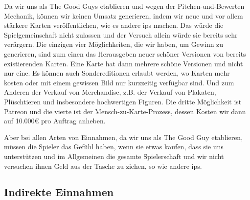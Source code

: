 \documentclass[fontsize=11, a4aper]{scrartcl}
\begin{document}
\noindent Da wir uns als \glqq The Good Guys\grqq{} etablieren und wegen der Pitchen-und-Bewerten Mechanik, können wir keinen Umsatz generieren, indem wir neue und vor allem stärkere Karten veröffentlichen, wie es andere \acp{ip} machen. Das würde die Spielgemeinschaft nicht zulassen und der Versuch allein würde sie bereits sehr verärgern. Die einzigen vier Möglichkeiten, die wir haben, um Gewinn zu generieren, sind zum einen das Herausgeben neuer schöner Versionen von bereits existierenden Karten. Eine Karte hat dann mehrere schöne Versionen und nicht nur eine. Es können auch Sondereditionen erlaubt werden, wo Karten mehr kosten oder mit einem gewissen Bild nur kurzzeitig verfügbar sind. Und zum Anderen der Verkauf von Merchandise, z.B. der Verkauf von Plakaten, Plüschtieren und insbesondere hochwertigen Figuren. Die dritte Möglichkeit ist Patreon und die vierte ist der \glqq Mensch-zu-Karte-Prozess\grqq, dessen Kosten wir dann auf 10.000€ pro Auftrag anheben.\hfill\newline

\noindent Aber bei allen Arten von Einnahmen, da wir uns als \glqq The Good Guy\grqq{} etablieren, müssen die Spieler das Gefühl haben, wenn sie etwas kaufen, dass sie uns unterstützen und im Allgemeinen die gesamte Spielerschaft und wir nicht versuchen ihnen Geld aus der Tasche zu ziehen, so wie andere \acp{ip}. 

\subsection{Indirekte Einnahmen} \label{subsec:Indirekte_Einnahmen}
\end{document}
